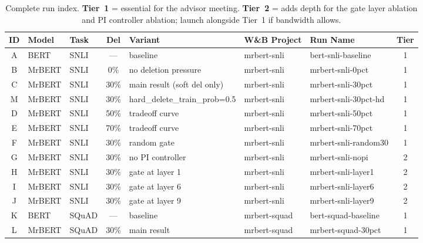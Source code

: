 \documentclass[11pt,a4paper]{article}
\begin{document}
\begin{table}[h]
\centering
\small
\begin{tabular}{@{}cllclllc@{}}
\toprule
\textbf{ID} & \textbf{Model} & \textbf{Task} & \textbf{Del} & \textbf{Variant} & \textbf{W\&B Project} & \textbf{Run Name} & \textbf{Tier} \\
\midrule
A & BERT   & SNLI  & ---  & baseline                      & mrbert-snli  & bert-snli-baseline    & 1 \\
B & MrBERT & SNLI  & 0\%  & no deletion pressure          & mrbert-snli  & mrbert-snli-0pct      & 1 \\
C & MrBERT & SNLI  & 30\% & main result (soft del only)   & mrbert-snli  & mrbert-snli-30pct     & 1 \\
M & MrBERT & SNLI  & 30\% & hard\_delete\_train\_prob=0.5 & mrbert-snli  & mrbert-snli-30pct-hd  & 1 \\
D & MrBERT & SNLI  & 50\% & tradeoff curve                & mrbert-snli  & mrbert-snli-50pct     & 1 \\
E & MrBERT & SNLI  & 70\% & tradeoff curve                & mrbert-snli  & mrbert-snli-70pct     & 1 \\
F & MrBERT & SNLI  & 30\% & random gate                   & mrbert-snli  & mrbert-snli-random30  & 1 \\
G & MrBERT & SNLI  & 30\% & no PI controller              & mrbert-snli  & mrbert-snli-nopi      & 2 \\
H & MrBERT & SNLI  & 30\% & gate at layer 1               & mrbert-snli  & mrbert-snli-layer1    & 2 \\
I & MrBERT & SNLI  & 30\% & gate at layer 6               & mrbert-snli  & mrbert-snli-layer6    & 2 \\
J & MrBERT & SNLI  & 30\% & gate at layer 9               & mrbert-snli  & mrbert-snli-layer9    & 2 \\
K & BERT   & SQuAD & ---  & baseline                      & mrbert-squad & bert-squad-baseline   & 1 \\
L & MrBERT & SQuAD & 30\% & main result                   & mrbert-squad & mrbert-squad-30pct    & 1 \\
\bottomrule
\end{tabular}
\caption{Complete run index. \textbf{Tier~1} = essential for the advisor meeting. \textbf{Tier~2} = adds depth for the gate layer ablation and PI controller ablation; launch alongside Tier~1 if bandwidth allows.}
\label{tab:run-index}
\end{table}
\end{document}
